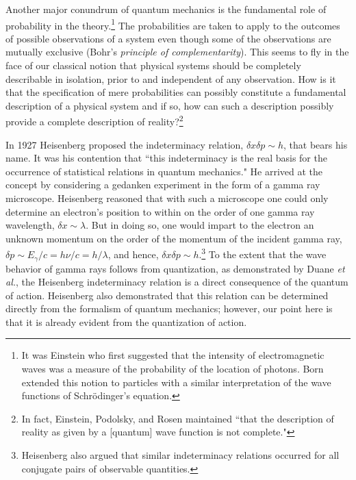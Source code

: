 \documentclass[12pt]{article}
\begin{document}
Another major conundrum of quantum mechanics is the fundamental role of probability in the theory.\footnote{It was Einstein who first suggested that the intensity of electromagnetic waves was a measure of the probability of the location of photons. Born extended this notion to particles with a similar interpretation of the wave functions of Schr\"{o}dinger's equation.\cite{St2013}} The probabilities are taken to apply to the outcomes of possible observations of a system even though some of the observations are mutually exclusive (Bohr's {\it principle of complementarity}).  This seems to fly in the face of our classical notion that physical systems should be completely describable in isolation, prior to and independent of any observation.  How is it that the specification of mere probabilities can possibly constitute a fundamental description of a physical system and if so, how can such a description possibly provide a complete description of reality?\footnote{In fact, Einstein, Podolsky, and Rosen\cite{Ei1935} maintained ``that the description of reality as given by a [quantum] wave function is not complete."}

In 1927 Heisenberg proposed the indeterminacy relation, $\delta x\delta p \sim h$, that bears his name.  It was his contention that ``this indeterminacy is the real basis for the occurrence of statistical relations in quantum mechanics."\cite{He1927}   He arrived at the concept by considering a gedanken experiment in the form of a gamma ray microscope.  Heisenberg reasoned that with such a microscope one could only determine an electron's position to within on the order of one gamma ray wavelength, $\delta x \sim \lambda$.  But in doing so, one would impart to the electron an unknown momentum on the order of the momentum of the incident gamma ray, $\delta p \sim  E_{\gamma}/c=h\nu/c=h/\lambda$, and hence, $\delta x\delta p \sim h$.\footnote{Heisenberg also argued that similar indeterminacy relations occurred for all conjugate pairs of observable quantities.} To the extent that the wave behavior of gamma rays follows from quantization, as demonstrated by Duane {\it et al.}, the Heisenberg indeterminacy relation is a direct consequence of the quantum of action.  Heisenberg also demonstrated that this relation can be determined directly from the formalism of quantum mechanics; however, our point here is that it is already evident from the quantization of action.
\end{document}

